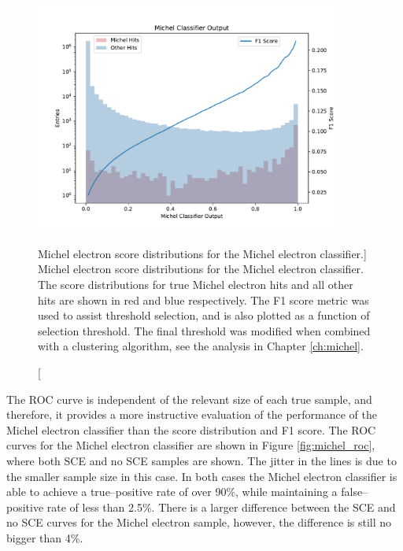 \begin{figure}
	\centering
	\includegraphics[width=0.9\textwidth]{figures/michel_combined.pdf} 
	\caption
	[Michel electron score distributions for the Michel electron classifier.]
	{Michel electron score distributions for the Michel electron classifier. The
	score distributions for true Michel electron hits and all other hits are shown
	in red and blue respectively. The F1 score metric was used to assist 
	threshold selection, and is also plotted as a function of selection 
	threshold. The final threshold was modified when combined with a clustering 
	algorithm, see the analysis in Chapter \ref{ch:michel}.}
	\label{fig:michel_output}
\end{figure}

The ROC curve is independent of the relevant size of each true sample, and
therefore, it provides a more instructive evaluation of the performance of the
Michel electron classifier than the score distribution and F1 score. The ROC 
curves for the Michel electron classifier are shown in Figure 
\ref{fig:michel_roc}, where both SCE and no SCE samples are shown. The jitter 
in the lines is due to the smaller sample size in this case. In both cases the 
Michel electron classifier is able to achieve a true--positive rate of over 90\%,
while maintaining a false--positive rate of less than 2.5\%. There is a larger 
difference between the SCE and no SCE curves for the Michel electron sample,
however, the difference is still no bigger than 4\%.

